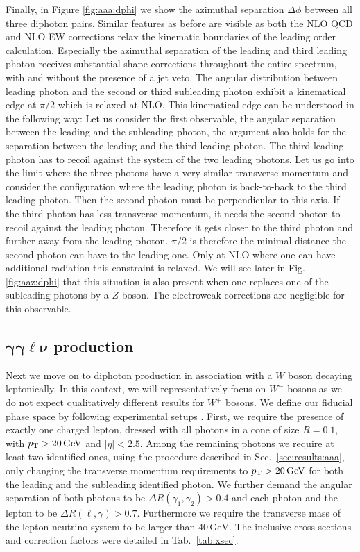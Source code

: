 Finally, in Figure \ref{fig:aaa:dphi} we show the azimuthal 
separation $\Delta\phi$ between all three diphoton pairs. 
Similar features as before are visible as both the NLO QCD 
and NLO EW corrections relax the kinematic boundaries of 
the leading order calculation. 
Especially the azimuthal separation of the leading and 
third leading photon receives substantial shape corrections 
throughout the entire spectrum, with and without the 
presence of a jet veto. The angular distribution between leading photon
and the second or third subleading photon exhibit a kinematical edge at $\pi/2$ which 
is relaxed at NLO. 
This kinematical edge can be understood in the following way:
 Let us consider the first observable, the angular separation between 
the leading and the subleading photon, the argument also holds for the separation between
the leading and the third leading photon. The third leading photon has to recoil against the
system of the two leading photons. Let us go into the limit where the three photons have
a very similar transverse momentum and consider the configuration where the leading
photon is back-to-back to the third leading photon. Then the second photon must 
be perpendicular to this axis. If the third photon has less transverse momentum, it 
needs the second photon to recoil against the leading photon. Therefore it gets closer
to the third photon and further away from the leading photon. $\pi/2$ is therefore the
minimal distance the second photon can have to the leading one.  Only at NLO where
one can have additional radiation this constraint is relaxed. We will see later in Fig.
\ref{fig:aaz:dphi} that this situation is also present when one replaces one of the subleading
photons by a $Z$ boson. 
The electroweak corrections are negligible for this 
observable.


\subsection[\texorpdfstring{$\gamma\gamma\ell\nu$}{aalnu} production]
           {$\boldsymbol{\gamma\gamma\ell\nu}$ production}
\label{sec:results:aaw}

Next we move on to diphoton production in association with 
a $W$ boson decaying leptonically.
In this context, we will representatively focus on $W^-$ bosons 
as we do not expect qualitatively different results for $W^+$ 
bosons. 
We define our fiducial phase space by following experimental setups \cite{Aad:2015uqa}. 
First, we require the presence of exactly one charged lepton, 
dressed with all photons in a cone of size $R=0.1$, with 
$p_\text{T}>20\,\text{GeV}$ and $|\eta|<2.5$. 
Among the remaining photons we require at least two identified 
ones, using the procedure described in Sec.\ \ref{sec:results:aaa}, 
only changing the transverse momentum requirements to 
$p_\text{T}>20\,\text{GeV}$ for both the leading and the subleading 
identified photon. 
We further demand the angular separation of both photons 
to be $\Delta R(\gamma_1,\gamma_2)>0.4$ and each photon and 
the lepton to be $\Delta R(\ell,\gamma)>0.7$.
Furthermore we require the transverse mass of the lepton-neutrino system
to be larger than $40\, \text{GeV}$.
The inclusive cross sections and correction factors were 
detailed in Tab.\ \ref{tab:xsec}.


